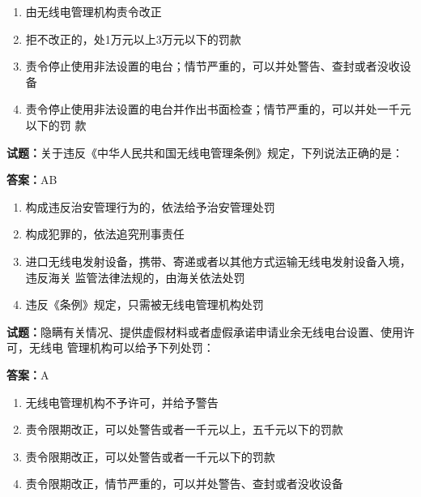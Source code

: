 \documentclass{ctexbook}
\begin{document}
\begin{enumerate}[leftmargin=3em]
  \item 由无线电管理机构责令改正 

  \item 拒不改正的，处1万元以上3万元以下的罚款 

  \item 责令停止使用非法设置的电台；情节严重的，可以并处警告、查封或者没收设备 

  \item 责令停止使用非法设置的电台并作出书面检查；情节严重的，可以并处一千元以下的罚
款 

\end{enumerate}





\vspace{1em}

\textbf{试题：}关于违反《中华人民共和国无线电管理条例》规定，下列说法正确的是： 

\textbf{答案：}AB 

\begin{enumerate}[leftmargin=3em]
  \item 构成违反治安管理行为的，依法给予治安管理处罚 

  \item 构成犯罪的，依法追究刑事责任 

  \item 进口无线电发射设备，携带、寄递或者以其他方式运输无线电发射设备入境，违反海关
监管法律法规的，由海关依法处罚 

  \item 违反《条例》规定，只需被无线电管理机构处罚 

\end{enumerate}





\vspace{1em}

\textbf{试题：}隐瞒有关情况、提供虚假材料或者虚假承诺申请业余无线电台设置、使用许可，无线电
管理机构可以给予下列处罚： 

\textbf{答案：}A 

\begin{enumerate}[leftmargin=3em]
  \item 无线电管理机构不予许可，并给予警告 

  \item 责令限期改正，可以处警告或者一千元以上，五千元以下的罚款 

  \item 责令限期改正，可以处警告或者一千元以下的罚款 

  \item 责令限期改正，情节严重的，可以并处警告、查封或者没收设备 

\end{enumerate}
\end{document}
